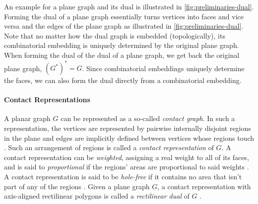 An example for a plane graph and its dual is illustrated in \cref{fig:preliminaries-dual}. Forming the dual of a plane graph essentially turns vertices into faces and vice versa and  the edges of the plane graph as illustrated in \cref{fig:preliminaries-dual}. Note that no matter how the dual graph is embedded (topologically), its combinatorial embedding is uniquely determined by the original plane graph. When forming the dual of the dual of a plane graph, we get back the original plane graph, \ie{} $(G^*)^* = G$. Since combinatorial embeddings uniquely determine the faces, we can also form the dual directly from a combinatorial embedding.




\paragraph{Contact Representations}

\begin{definition}
	A planar graph $G$ can be represented as a so-called \emph{contact graph}. In such a representation, the vertices are represented by pairwise internally disjoint regions in the plane and edges are implicitly defined between vertices whose regions touch \cite{alam2013linear}.
	Such an arrangement of regions is called a \emph{contact representation} of $G$.
	A contact representation can be \emph{weighted}, assigning a real weight to all of its faces, and is said to \emph{proportional} if the regions' areas are proportional to said weights \cite{alam2013linear}.
	A contact representation is said to be \emph{hole-free} if it contains no area that isn't part of any of the regions \cite{alam2013linear}.
	Given a plane graph $G$, a contact representation with axis-aligned rectilinear polygons is called a \emph{rectilinear dual} of $G$ \cite{alam2013computing}.
\end{definition}

